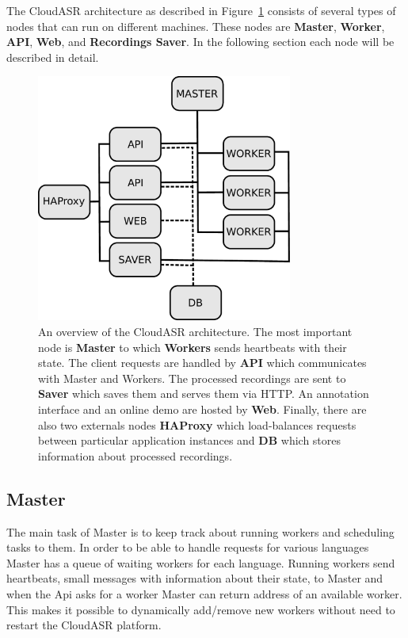 The CloudASR architecture as described in Figure~\ref{fig:architecture} consists of several types of nodes that can run on different machines.
These nodes are \textbf{Master}, \textbf{Worker}, \textbf{API}, \textbf{Web},  and \textbf{Recordings Saver}.
In the following section each node will be described in detail.


\begin{figure}[h]
  \centering
  \includegraphics[width=0.75\textwidth]{./img/architecture.pdf}

  \caption{
    An overview of the CloudASR architecture.
    The most important node is \textbf{Master} to which \textbf{Workers} sends heartbeats with their state.
    The client requests are handled by \textbf{API} which communicates with Master and Workers.
    The processed recordings are sent to \textbf{Saver} which saves them and serves them via HTTP.
    An annotation interface and an online demo are hosted by \textbf{Web}.
    Finally, there are also two externals nodes \textbf{HAProxy}
      which load-balances requests between particular application instances
      and \textbf{DB} which stores information about processed recordings.
  }
  \label{fig:architecture}
\end{figure}


\subsection{Master}
The main task of Master is to keep track about running workers and scheduling tasks to them.
In order to be able to handle requests for various languages
  Master has a queue of waiting workers for each language.
Running workers send heartbeats, small messages with information about their state, to Master
  and when the Api asks for a worker Master can return address of an available worker.
This makes it possible to dynamically add/remove new workers without need to restart the CloudASR platform.

